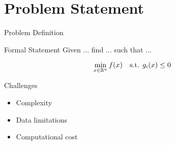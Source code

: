 \section{Problem Statement}

\begin{frame}{Problem Definition}
  \begin{block}{Formal Statement}
    Given ... find ... such that ...
  \end{block}
  \[
    \min_{x \in \mathbb{R}^n} f(x) \quad \text{s.t. } g_i(x)\le 0
  \]
\end{frame}

\begin{frame}{Challenges}
  \begin{itemize}
    \item Complexity
    \item Data limitations
    \item Computational cost
  \end{itemize}
\end{frame}
